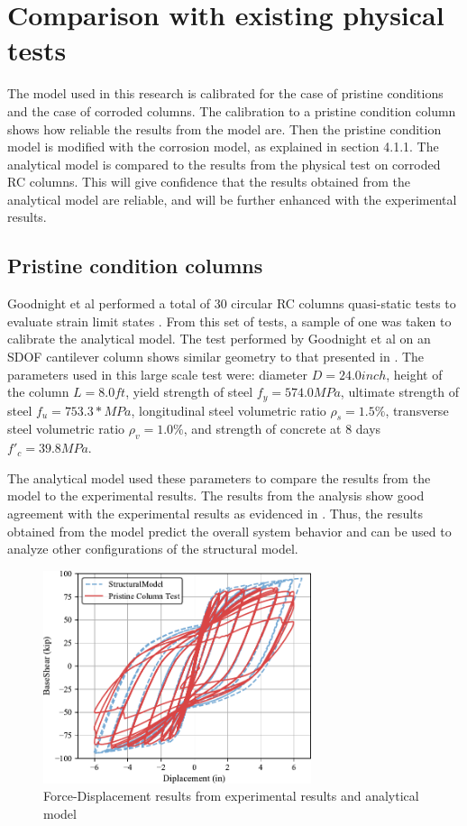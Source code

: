 \section{Comparison with existing physical tests}
The model used in this research is calibrated for the case of pristine conditions and the case of corroded columns. The calibration to a pristine condition column shows how reliable the results from the model are. Then the pristine condition model is modified with the corrosion model, as explained in section 4.1.1. The analytical model is compared to the results from the physical test on corroded RC columns. This will give confidence that the results obtained from the analytical model are reliable, and will be further enhanced with the experimental results.
\subsection{Pristine condition columns}
Goodnight et al performed a total of 30 circular RC columns quasi-static tests to evaluate strain limit states \cite{Goodnight2016}. From this set of tests, a sample of one was taken to calibrate the analytical model. The test performed by Goodnight et al on an SDOF cantilever column shows similar geometry to that presented in . The parameters used in this large scale test were: diameter $D = 24.0 inch$, height of the column $L = 8.0 ft$, yield strength of steel $f_{y} = 574.0 MPa$, ultimate strength of steel $f_{u} = 753.3 * MPa$, longitudinal steel volumetric ratio $\rho_{s} = 1.5\% $, transverse steel volumetric ratio $\rho_{v} = 1.0\% $, and strength of concrete at 8 days $f'_{c} = 39.8 MPa$.

The analytical model used these parameters to compare the results from the model to the experimental results. The results from the analysis show good agreement with the experimental results as evidenced in . Thus, the results obtained from the model predict the overall system behavior and can be used to analyze other configurations of the structural model.
\begin{figure}[htbp]
	\centering
	\includegraphics[width=0.7\textwidth]{Chapter-5/figs/Calibration_Test_26_Goodnight_et_al.pdf}
	\caption{Force-Displacement results from experimental results \cite{Goodnight2013} and analytical model}
	\label{fig:ModelCalibration}
\end{figure}
\newpage

